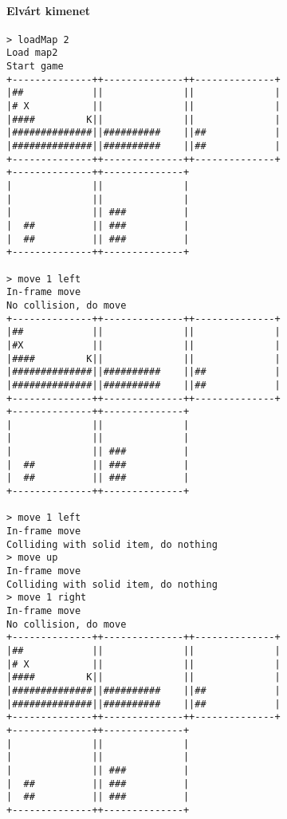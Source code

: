 		        \paragraph*{Elvárt kimenet}
\begin{verbatim}
> loadMap 2
Load map2
Start game
+--------------++--------------++--------------+
|##            ||              ||              |
|# X           ||              ||              |
|####         K||              ||              |
|##############||##########    ||##            |
|##############||##########    ||##            |
+--------------++--------------++--------------+
+--------------++--------------+                
|              ||              |                
|              ||              |                
|              || ###          |                
|  ##          || ###          |                
|  ##          || ###          |                
+--------------++--------------+                

> move 1 left
In-frame move
No collision, do move
+--------------++--------------++--------------+
|##            ||              ||              |
|#X            ||              ||              |
|####         K||              ||              |
|##############||##########    ||##            |
|##############||##########    ||##            |
+--------------++--------------++--------------+
+--------------++--------------+                
|              ||              |                
|              ||              |                
|              || ###          |                
|  ##          || ###          |                
|  ##          || ###          |                
+--------------++--------------+                

> move 1 left
In-frame move
Colliding with solid item, do nothing
> move up
In-frame move
Colliding with solid item, do nothing
> move 1 right
In-frame move
No collision, do move
+--------------++--------------++--------------+
|##            ||              ||              |
|# X           ||              ||              |
|####         K||              ||              |
|##############||##########    ||##            |
|##############||##########    ||##            |
+--------------++--------------++--------------+
+--------------++--------------+                
|              ||              |                
|              ||              |                
|              || ###          |                
|  ##          || ###          |                
|  ##          || ###          |                
+--------------++--------------+                


\end{verbatim}
